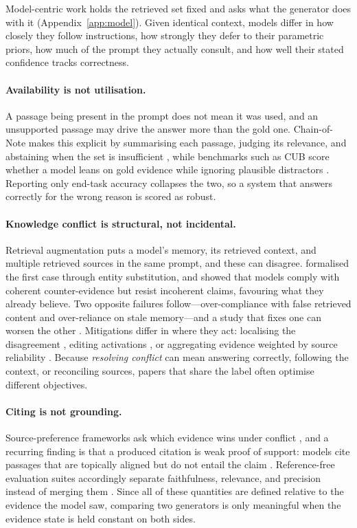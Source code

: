 Model-centric work holds the retrieved set fixed and asks what the generator does with it
(Appendix~\ref{app:model}). Given identical context, models differ in how closely they follow
instructions, how strongly they defer to their parametric priors, how much of the prompt they
actually consult, and how well their stated confidence tracks correctness.

\paragraph{Availability is not utilisation.}
A passage being present in the prompt does not mean it was used, and an unsupported passage may
drive the answer more than the gold one. Chain-of-Note makes this explicit by summarising each
passage, judging its relevance, and abstaining when the set is insufficient
\citep{chainOfNote2023}, while benchmarks such as CUB score whether a model leans on gold
evidence while ignoring plausible distractors \citep{rrag032}. Reporting only end-task accuracy
collapses the two, so a system that answers correctly for the wrong reason is scored as robust.

\paragraph{Knowledge conflict is structural, not incidental.}
Retrieval augmentation puts a model's memory, its retrieved context, and multiple retrieved
sources in the same prompt, and these can disagree. \citet{longpre2021conflicts} formalised the
first case through entity substitution, and \citet{xie2024chameleon} showed that models comply
with coherent counter-evidence but resist incoherent claims, favouring what they already
believe. Two opposite failures follow---over-compliance with false retrieved content and
over-reliance on stale memory---and a study that fixes one can worsen the other
\citep{tugOfWar2024}. Mitigations differ in where they act: localising the disagreement
\citep{faithfulRAG2025}, editing activations \citep{rrag008}, or aggregating evidence weighted by
source reliability \citep{astuteRAG2025}. Because \emph{resolving conflict} can mean answering
correctly, following the context, or reconciling sources, papers that share the label often
optimise different objectives.

\paragraph{Citing is not grounding.}
Source-preference frameworks ask which evidence wins under conflict \citep{rrag132,rrag110}, and
a recurring finding is that a produced citation is weak proof of support: models cite passages
that are topically aligned but do not entail the claim \citep{ragTruth2024}. Reference-free
evaluation suites accordingly separate faithfulness, relevance, and precision instead of merging
them \citep{ragas2024,ares2024}. Since all of these quantities are defined relative to the
evidence the model saw, comparing two generators is only meaningful when the evidence state is
held constant on both sides.
